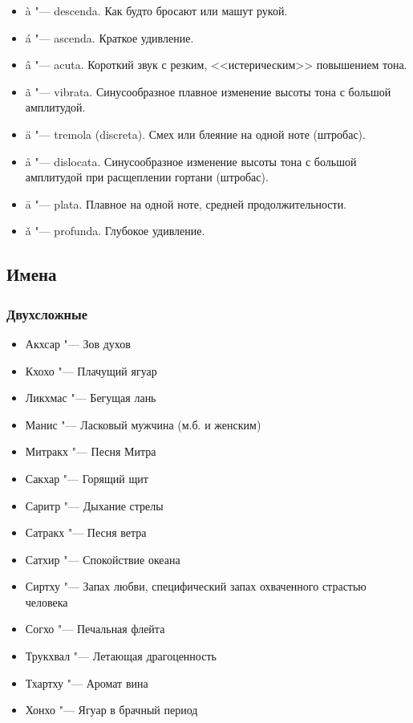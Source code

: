 \begin{itemize}
\item \`a "--- descenda. Как будто бросают или машут рукой.
\item \'a "--- ascenda. Краткое удивление.
\item \^a "--- acuta. Короткий звук с резким, <<истерическим>> повышением тона.
\item \~a "--- vibrata. Синусообразное плавное изменение высоты тона с большой амплитудой.
\item \"a "--- tremola (discreta). Смех или блеяние на одной ноте (штробас).
\item \r{a} "--- dislocata. Синусообразное изменение высоты тона с большой амплитудой при расщеплении гортани (штробас).
\item \=a "--- plata. Плавное на одной ноте, средней продолжительности.
\item \v{a} "--- profunda. Глубокое удивление.
\end{itemize}

\subsection{Имена}

\subsubsection{Двухсложные}

\begin{itemize}
\item Акхсар "--- Зов духов
\item Кхохо "--- Плачущий ягуар
\item Ликхмас "--- Бегущая лань
\item Манис "--- Ласковый мужчина (м.б. и женским)
\item Митракх "--- Песня Митра
\item Сакхар "--- Горящий щит
\item Саритр "--- Дыхание стрелы
\item Сатракх "--- Песня ветра
\item Сатхир "--- Спокойствие океана
\item Сиртху "--- Запах любви, специфический запах охваченного страстью человека
\item Согхо "--- Печальная флейта
\item Трукхвал "--- Летающая драгоценность
\item Тхартху "--- Аромат вина
\item Хонхо "--- Ягуар в брачный период
\end{itemize}

